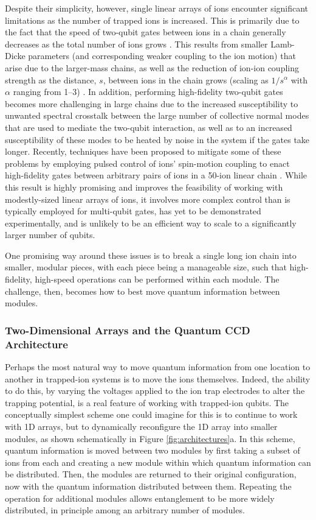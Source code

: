 \documentclass[%
12pt,
 amsmath,amssymb,
]{revtex4-2}
\begin{document}
Despite their simplicity, however, single linear arrays of ions encounter significant limitations as the number of trapped ions is increased.  This is primarily due to the fact that the speed of two-qubit gates between ions in a chain generally decreases as the total number of ions grows \cite{MonroeModularArch2014}.  This results from smaller Lamb-Dicke parameters (and corresponding weaker coupling to the ion motion) that arise due to the larger-mass chains, as well as the reduction of ion-ion coupling strength as the distance, $s$, between ions in the chain grows (scaling as $1/s^{\alpha}$ with $\alpha$ ranging from 1--3) \cite{LeungArbitraryEntangling2018}.  In addition, performing high-fidelity two-qubit gates becomes more challenging in large chains due to the increased susceptibility to unwanted spectral crosstalk between the large number of collective normal modes that are used to mediate the two-qubit interaction, as well as to an increased susceptibility of these modes to be heated by noise in the system if the gates take longer.  Recently, techniques have been proposed to mitigate some of these problems by employing pulsed control of ions' spin-motion coupling to enact high-fidelity gates between arbitrary pairs of ions in a 50-ion linear chain \cite{ZhuArbitrarySpeed2006,LeungArbitraryEntangling2018}.  While this result is highly promising and improves the feasibility of working with modestly-sized linear arrays of ions, it involves more complex control than is typically employed for multi-qubit gates, has yet to be demonstrated experimentally, and is unlikely to be an efficient way to scale to a significantly larger number of qubits.

One promising way around these issues is to break a single long ion chain into smaller, modular pieces, with each piece being a manageable size, such that high-fidelity, high-speed operations can be performed within each module.  The challenge, then, becomes how to best move quantum information between modules.

    \subsubsection{Two-Dimensional Arrays and the Quantum CCD Architecture}
    \label{2DArrays}
Perhaps the most natural way to move quantum information from one location to another in trapped-ion systems is to move the ions themselves.  Indeed, the ability to do this, by varying the voltages applied to the ion trap electrodes to alter the trapping potential, is a real feature of working with trapped-ion qubits.  The conceptually simplest scheme one could imagine for this is to continue to work with 1D arrays, but to dynamically reconfigure the 1D array into smaller modules, as shown schematically in Figure \ref{fig:architectures}a.  In this scheme, quantum information is moved between two modules by first taking a subset of ions from each and creating a new module within which quantum information can be distributed.  Then, the modules are returned to their original configuration, now with the quantum information distributed between them. Repeating the operation for additional modules allows entanglement to be more widely distributed, in principle among an arbitrary number of modules.
\end{document}
